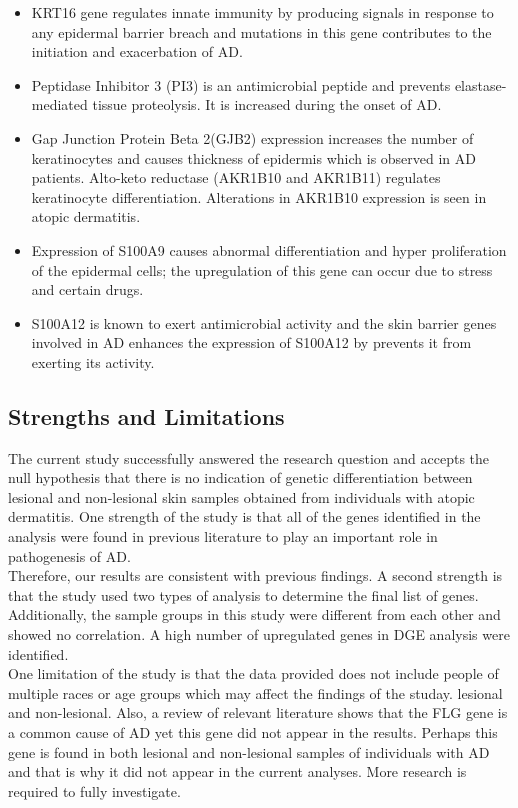 \documentclass[journal, a4paper]{IEEEtran}
\begin{document}
\begin{itemize}
  \item KRT16 gene regulates innate immunity by producing signals in response to any epidermal barrier breach and mutations in this gene contributes to the initiation and exacerbation of AD.
  \item Peptidase Inhibitor 3 (PI3) is an antimicrobial peptide and prevents elastase-mediated tissue proteolysis. It is increased during the onset of AD.
  \item Gap Junction Protein Beta 2(GJB2) expression increases the number of keratinocytes and causes thickness of epidermis which is observed in AD patients.
Alto-keto reductase (AKR1B10 and AKR1B11) regulates keratinocyte differentiation. Alterations in AKR1B10 expression is seen in atopic dermatitis.
  \item Expression of S100A9 causes abnormal differentiation and hyper proliferation of the epidermal cells; the upregulation of this gene can occur due to stress and certain drugs.
  \item S100A12 is known to exert antimicrobial activity and the skin barrier genes involved in AD enhances the expression of S100A12 by prevents it from exerting its activity.
\end{itemize}

\subsection{Strengths and Limitations}

The current study successfully answered the research question and accepts the null hypothesis that there is no indication of genetic differentiation between lesional and non-lesional skin samples obtained from individuals with atopic dermatitis. One strength of the study is that all of the genes identified in the analysis were found in previous literature to play an important role in pathogenesis of AD.\\

Therefore, our results are consistent with previous findings.  A second strength is that the study used two types of analysis to determine the final list of genes. Additionally, the sample groups in this study were different from each other and showed no correlation. A high number of upregulated genes in DGE analysis were identified.\\

One limitation of the study is that the data provided does not include people of multiple races or age groups which may affect the findings of the studay. lesional and non-lesional. Also, a review of relevant literature shows that the FLG gene is a common cause of AD yet this gene did not appear in the results. Perhaps this gene is found in both lesional and non-lesional samples of individuals with AD and that is why it did not appear in the current analyses. More research is required to fully investigate.\\
\end{document}
